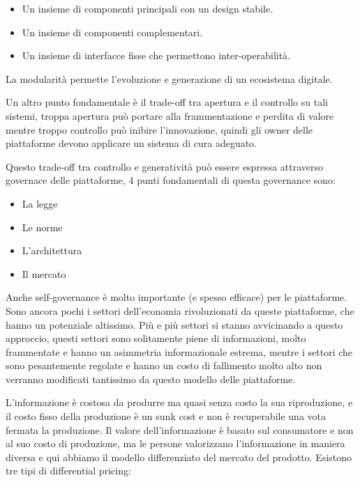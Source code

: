 \documentclass[a4page, 11pt]{article}
\begin{document}
\begin{itemize}
	 
	\item
	Un insieme di componenti principali con un design stabile.
	\item
	Un insieme di componenti complementari.
	\item
	Un insieme di interfacce fisse che permettono inter-operabilità.
\end{itemize}

La modularità permette l'evoluzione e generazione di un ecosistema
digitale.

Un altro punto fondamentale è il trade-off tra apertura e il controllo
su tali sistemi, troppa apertura può portare alla frammentazione e
perdita di valore mentre troppo controllo può inibire l'innovazione,
quindi gli owner delle piattaforme devono applicare un sistema di cura
adeguato.

Questo trade-off tra controllo e generatività può essere espressa
attraverso governace delle piattaforme, 4 punti fondamentali di questa
governance sono:

\begin{itemize}
	 
	\item
	La legge
	\item
	Le norme
	\item
	L'architettura
	\item
	Il mercato
\end{itemize}

Anche self-governance è molto importante (e spesso efficace) per le
piattaforme. Sono ancora pochi i settori dell'economia rivoluzionati da
queste piattaforme, che hanno un potenziale altissimo. Più e più settori
si stanno avvicinando a questo approccio, questi settori sono
solitamente piene di informazioni, molto frammentate e hanno un
asimmetria informazionale estrema, mentre i settori che sono
pesantemente regolate e hanno un costo di fallimento molto alto non
verranno modificati tantissimo da questo modello delle piattaforme.

L'informazione è costosa da produrre ma quasi senza costo la sua
riproduzione, e il costo fisso della produzione è un sunk cost e non è
recuperabile una vota fermata la produzione. Il valore dell'informazione
è basato sul consumatore e non al suo costo di produzione, ma le persone
valorizzano l'informazione in maniera diversa e qui abbiamo il modello
differenziato del mercato del prodotto. Esistono tre tipi di
differential pricing:
\end{document}
